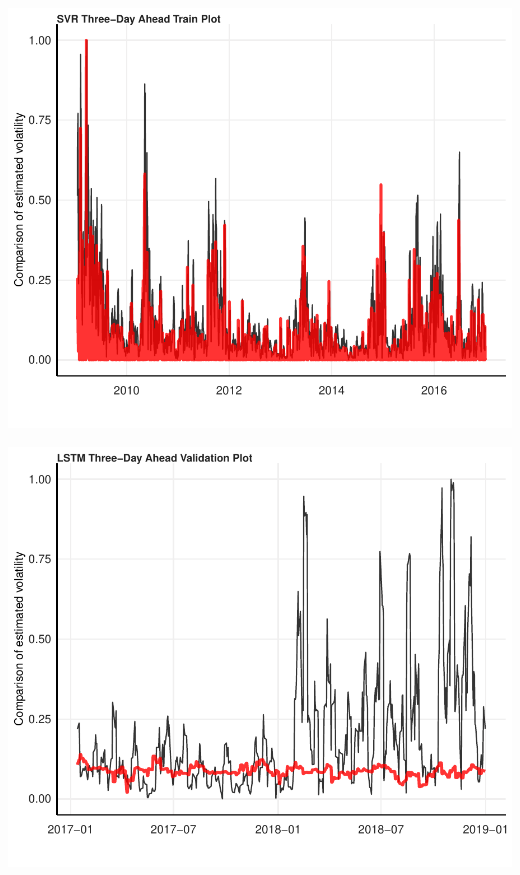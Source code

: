 \documentclass[11pt,preprint, authoryear]{elsarticle}
\let\origfigure\figure
\let\endorigfigure\endfigure
\renewenvironment{figure}[1][2] {
    \expandafter\origfigure\expandafter[H]
} {
    \endorigfigure
}
\numberwithin{equation}{section}
\numberwithin{figure}{section}
\numberwithin{table}{section}
\begin{document}
\begin{figure}[H]

{\centering \includegraphics{Essay_files/figure-latex/plot_7-1} 

}

\caption{SVR Three-Day Ahead Training Forecast}\label{fig:plot_7}
\end{figure}

\begin{figure}[H]

{\centering \includegraphics{Essay_files/figure-latex/plot_8-1} 

}

\caption{LSTM Three-Day Ahead Validation Forecast}\label{fig:plot_8}
\end{figure}
\end{document}
